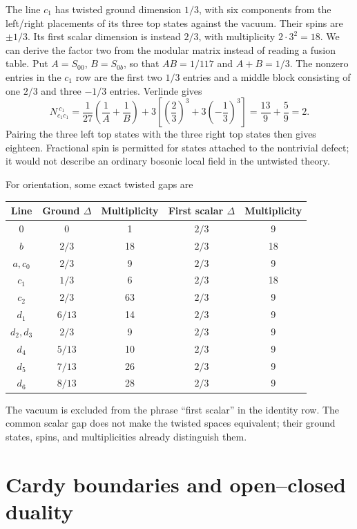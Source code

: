 \begin{example}
The line $c_1$ has twisted ground dimension $1/3$, with six
components from the left/right placements of its three top states
against the vacuum. Their spins are $\pm1/3$.
Its first scalar dimension is instead $2/3$, with multiplicity
$2\cdot3^2=18$. We can derive the factor two from the
modular matrix instead of reading a fusion table. Put
$A=S_{00}$, $B=S_{0b}$, so that $AB=1/117$ and
$A+B=1/3$. The nonzero entries in the $c_1$ row are
the first two $1/3$ entries and a middle block consisting
of one $2/3$ and three $-1/3$ entries. Verlinde gives
\[
 N_{c_1c_1}^{\ c_1}
 =\frac1{27}\left(\frac1A+\frac1B\right)
   +3\left[\left(\frac23\right)^3
                +3\left(-\frac13\right)^3\right]
 =\frac{13}{9}+\frac59=2.
\]
Pairing the three left top states with the three right top
states then gives eighteen. Fractional spin is permitted for states attached
to the nontrivial defect; it would not describe an ordinary
bosonic local field in the untwisted theory.
\end{example}

For orientation, some exact twisted gaps are
\begin{center}
\begin{tabular}{c|cc|cc}
\toprule
Line&Ground $\Delta$&Multiplicity&First scalar $\Delta$&Multiplicity\\
\midrule
$0$&0&1&$2/3$&9\\
$b$&$2/3$&18&$2/3$&18\\
$a,c_0$&$2/3$&9&$2/3$&9\\
$c_1$&$1/3$&6&$2/3$&18\\
$c_2$&$2/3$&63&$2/3$&9\\
$d_1$&$6/13$&14&$2/3$&9\\
$d_2,d_3$&$2/3$&9&$2/3$&9\\
$d_4$&$5/13$&10&$2/3$&9\\
$d_5$&$7/13$&26&$2/3$&9\\
$d_6$&$8/13$&28&$2/3$&9\\
\bottomrule
\end{tabular}
\end{center}
The vacuum is excluded from the phrase ``first scalar'' in the
identity row. The common scalar gap does not make the twisted
spaces equivalent; their ground states, spins, and multiplicities
already distinguish them.

\section{Cardy boundaries and open--closed duality}

